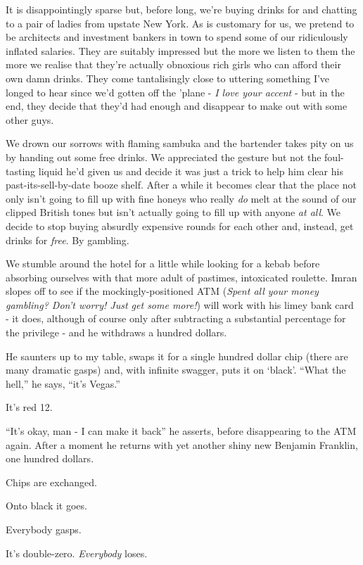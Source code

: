 \documentclass[a5paper,titlepage,11pt]{book}
\begin{document}
It is disappointingly sparse but, before long, we're buying drinks for and chatting to a pair of ladies from upstate New York.  As is customary for us, we pretend to be architects and investment bankers in town to spend some of our ridiculously inflated salaries.  They are suitably impressed but the more we listen to them the more we realise that they're actually obnoxious rich girls who can afford their own damn drinks.  They come tantalisingly close to uttering something I've longed to hear since we'd gotten off the 'plane - \emph{I love your accent} - but in the end, they decide that they'd had enough and disappear to make out with some other guys.

We drown our sorrows with flaming sambuka and the bartender takes pity on us by handing out some free drinks.  We appreciated the gesture but not the foul-tasting liquid he'd given us and decide it was just a trick to help him clear his past-its-sell-by-date booze shelf.  After a while it becomes clear that the place not only isn't going to fill up with fine honeys who really \emph{do} melt at the sound of our clipped British tones but isn't actually going to fill up with anyone \emph{at all}.  We decide to stop buying absurdly expensive rounds for each other and, instead, get drinks for \emph{free}.  By gambling.

We stumble around the hotel for a little while looking for a kebab before absorbing ourselves with that more adult of pastimes, intoxicated roulette.  Imran slopes off to see if the mockingly-positioned ATM (\emph{Spent all your money gambling?  Don't worry!  Just get some more!}) will work with his limey bank card - it does, although of course only after subtracting a substantial percentage for the privilege - and he withdraws a hundred dollars.

He saunters up to my table, swaps it for a single hundred dollar chip (there are many dramatic gasps) and, with infinite swagger, puts it on `black'.  ``What the hell,'' he says, ``it's Vegas.''

It's red 12.

``It's okay, man - I can make it back'' he asserts, before disappearing to the ATM again.  After a moment he returns with yet another shiny new Benjamin Franklin, one hundred dollars.

Chips are exchanged.

Onto black it goes.

Everybody gasps.

It's double-zero.  \emph{Everybody} loses.
\end{document}
